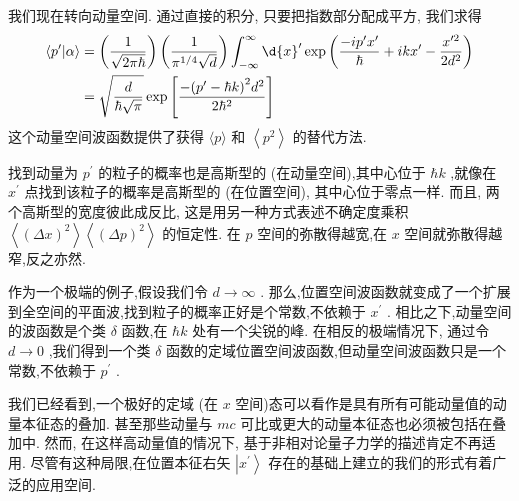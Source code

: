 \documentclass[lang=cn,newtx,10pt,scheme=chinese,thmcnt=section]{elegantbook}
\begin{document}
我们现在转向动量空间. 通过直接的积分, 只要把指数部分配成平方, 我们求得
\begin{equation}
	\begin{aligned}
		\left\langle {{p}^{\prime } | \alpha }\right\rangle &= \left( \frac{1}{\sqrt{{2\pi }\hbar }}\right) \left( \frac{1}{{\pi }^{1/4}\sqrt{d}}\right) \int_{-\infty }^{\infty }\d{x}^{\prime }\exp \left( {\frac{-i{p}^{\prime }{x}^{\prime }}{\hbar } + {ik}{x}^{\prime } - \frac{{x}^{\prime 2}}{2{d}^{2}}}\right)\\
		&= \sqrt{\frac{d}{\hbar \sqrt{\pi }}}\exp \left\lbrack \frac{-{\left( {p}^{\prime } - \hbar k\right) }^{2}{d}^{2}}{2{\hbar }^{2}}\right\rbrack
	\end{aligned}
\end{equation}
这个动量空间波函数提供了获得 $\langle p\rangle$ 和 $\left\langle {p}^{2}\right\rangle$ 的替代方法.

找到动量为 ${p}^{\prime }$ 的粒子的概率也是高斯型的 (在动量空间),其中心位于 $\hbar k$ ,就像在 ${x}^{\prime }$ 点找到该粒子的概率是高斯型的 (在位置空间), 其中心位于零点一样. 而且, 两个高斯型的宽度彼此成反比, 这是用另一种方式表述不确定度乘积 $\left\langle {\left( \Delta x\right) }^{2}\right\rangle \left\langle {\left( \Delta p\right) }^{2}\right\rangle$ 的恒定性. 在 $p$ 空间的弥散得越宽,在 $x$ 空间就弥散得越窄,反之亦然.

作为一个极端的例子,假设我们令 $d \rightarrow \infty$ . 那么,位置空间波函数就变成了一个扩展到全空间的平面波,找到粒子的概率正好是个常数,不依赖于 ${x}^{\prime }$ . 相比之下,动量空间的波函数是个类 $\delta$ 函数,在 $\hbar k$ 处有一个尖锐的峰. 在相反的极端情况下, 通过令 $d \rightarrow 0$ ,我们得到一个类 $\delta$ 函数的定域位置空间波函数,但动量空间波函数只是一个常数,不依赖于 ${p}^{\prime }$ .

我们已经看到,一个极好的定域 (在 $x$ 空间)态可以看作是具有所有可能动量值的动量本征态的叠加. 甚至那些动量与 ${mc}$ 可比或更大的动量本征态也必须被包括在叠加中. 然而, 在这样高动量值的情况下, 基于非相对论量子力学的描述肯定不再适用. 尽管有这种局限,在位置本征右矢 $\left| {x}^{\prime }\right\rangle$ 存在的基础上建立的我们的形式有着广泛的应用空间.
\end{document}
